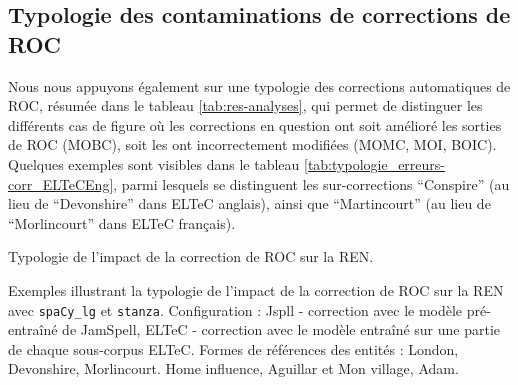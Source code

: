 
\subsection{Typologie des contaminations de corrections de ROC}
Nous nous appuyons également sur une typologie des corrections automatiques de ROC, résumée dans le tableau \ref{tab:res-analyses}, qui permet de distinguer les différents cas de figure où les corrections en question ont soit amélioré les sorties de ROC (MOBC), soit les ont incorrectement modifiées (MOMC, MOI, BOIC). Quelques exemples sont visibles dans le tableau \ref{tab:typologie_erreurs-corr_ELTeCEng}, 
parmi lesquels se distinguent les sur-corrections ``Conspire'' 
(au lieu de ``Devonshire'' 
dans ELTeC anglais), ainsi que ``Martincourt'' (au lieu de ``Morlincourt'' dans ELTeC français).



\begin{table}[h!]
\small
    \centering
    
    \caption{Typologie de l'impact de la correction de ROC sur la REN.  }
    \label{tab:res-analyses}
\end{table}

\begin{table}[h!]
\small
    \centering
   
    \caption{Exemples illustrant la typologie de l'impact de la correction de ROC sur la REN avec \texttt{spaCy\_lg} et \texttt{stanza}. Configuration : Jspll - correction avec le modèle pré-entraîné de JamSpell, ELTeC - correction avec le modèle entraîné sur une partie de chaque sous-corpus ELTeC. Formes de références des entités : London, Devonshire, Morlincourt. {\normalfont Home influence}, Aguillar et {\normalfont Mon village}, Adam.}
    \label{tab:typologie_erreurs-corr_ELTeCEng}
\end{table}


